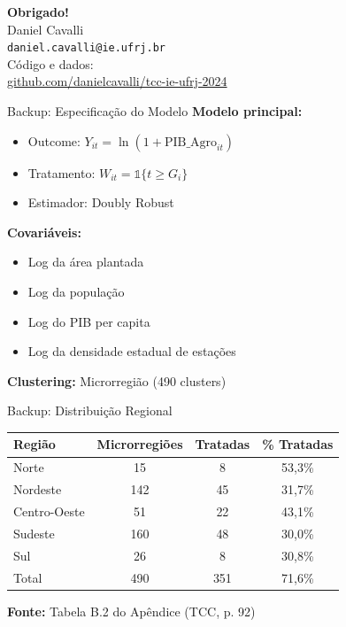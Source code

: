 \documentclass[10pt,aspectratio=169]{beamer}
\begin{document}
\begin{frame}{}
\centering
\Huge
\textbf{Obrigado!}\\
\vspace{1cm}
\Large
Daniel Cavalli\\
\normalsize
\texttt{daniel.cavalli@ie.ufrj.br}\\
\vspace{0.5cm}
Código e dados:\\
\url{github.com/danielcavalli/tcc-ie-ufrj-2024}
\end{frame}

\appendix

\begin{frame}{Backup: Especificação do Modelo}
\textbf{Modelo principal:}
\begin{itemize}
    \item Outcome: $Y_{it} = \ln(1 + \text{PIB\_Agro}_{it})$
    \item Tratamento: $W_{it} = \mathbb{1}\{t \geq G_i\}$
    \item Estimador: Doubly Robust
\end{itemize}

\vspace{0.3cm}
\textbf{Covariáveis:}
\begin{itemize}
    \item Log da área plantada
    \item Log da população
    \item Log do PIB per capita
    \item Log da densidade estadual de estações
\end{itemize}

\vspace{0.3cm}
\textbf{Clustering:} Microrregião (490 clusters)
\end{frame}

\begin{frame}{Backup: Distribuição Regional}
\begin{table}[h]
\centering
\begin{tabular}{lccc}
\toprule
Região & Microrregiões & Tratadas & \% Tratadas \\
\midrule
Norte & 15 & 8 & 53,3\% \\
Nordeste & 142 & 45 & 31,7\% \\
Centro-Oeste & 51 & 22 & 43,1\% \\
Sudeste & 160 & 48 & 30,0\% \\
Sul & 26 & 8 & 30,8\% \\
\midrule
Total & 490 & 351 & 71,6\% \\
\bottomrule
\end{tabular}
\end{table}

\textbf{Fonte:} Tabela B.2 do Apêndice (TCC, p. 92)
\end{frame}
\end{document}
